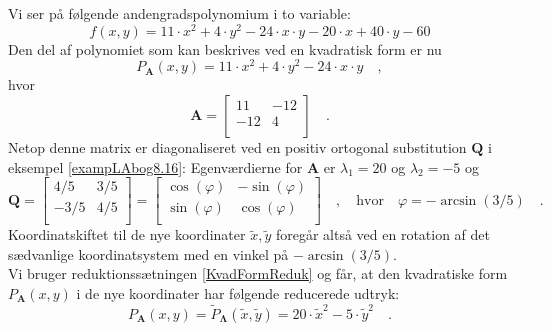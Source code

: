 \begin{example} \label{exampRedPoly1}
Vi ser på følgende andengradspolynomium i to variable:
\begin{equation}
f(x,y) = 11\cdot x^{2} + 4\cdot y^{2} - 24\cdot x\cdot y - 20\cdot x + 40\cdot y - 60
\end{equation}
Den del af polynomiet som kan beskrives ved en kvadratisk form er nu
\begin{equation}
P_{\mathbf{A}}(x,y) = 11\cdot x^{2} + 4\cdot y^{2} - 24\cdot x\cdot y \quad ,
\end{equation}
hvor
\begin{equation}
\mathbf{A} = \left[
               \begin{array}{cc}
                 11 & -12 \\
                 -12 & 4 \\
               \end{array}
             \right] \quad .
\end{equation}
Netop denne matrix er diagonaliseret ved en positiv ortogonal substitution $\mathbf{Q}$ i eksempel \ref{exampLAbog8.16}: Egenværdierne for $\mathbf{A}$ er $\lambda_{1} = 20  $ og $\lambda_{2} = -5 $ og
\begin{equation}
\mathbf{Q}= \left[
              \begin{array}{cc}
                4/5 & 3/5 \\
                -3/5 & 4/5 \\
              \end{array}
            \right]  = \left[
                         \begin{array}{cc}
                           \cos(\varphi) & - \sin(\varphi) \\
                           \sin(\varphi) & \cos(\varphi) \\
                         \end{array}
                       \right] \quad , \quad  \textrm{hvor}\quad \varphi = -\arcsin(3/5) \quad .
\end{equation}
Koordinatskiftet til de nye koordinater $\widetilde{x}, \widetilde{y}$ foregår altså ved en rotation af det sædvanlige koordinatsystem med en vinkel på $-\arcsin(3/5)$. \\

Vi bruger reduktionssætningen \ref{KvadFormReduk} og får, at den kvadratiske form $P_{\mathbf{A}}(x,y)$ i de nye koordinater har følgende reducerede udtryk:
\begin{equation}
P_{\mathbf{A}}(x,y) = \widetilde{P}_{\bm{\Lambda}}(\widetilde{x}, \widetilde{y}) = 20\cdot \widetilde{x}^{2} - 5\cdot \widetilde{y}^{2} \quad .
\end{equation}


\end{example}
